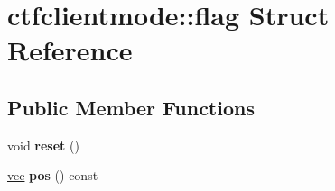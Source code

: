 \hypertarget{structctfclientmode_1_1flag}{}\section{ctfclientmode\+:\+:flag Struct Reference}
\label{structctfclientmode_1_1flag}
\subsection*{Public Member Functions}
\begin{DoxyCompactItemize}
\item 
\mbox{\label{structctfclientmode_1_1flag_ad9d0a8d57659004a1d16ebb7945c3d8a}} 
void {\bfseries reset} ()
\item 
\mbox{\label{structctfclientmode_1_1flag_a03511d40e10b8c359f2ff20c4279eadc}} 
\hyperlink{structvec}{vec} {\bfseries pos} () const
\end{DoxyCompactItemize}
